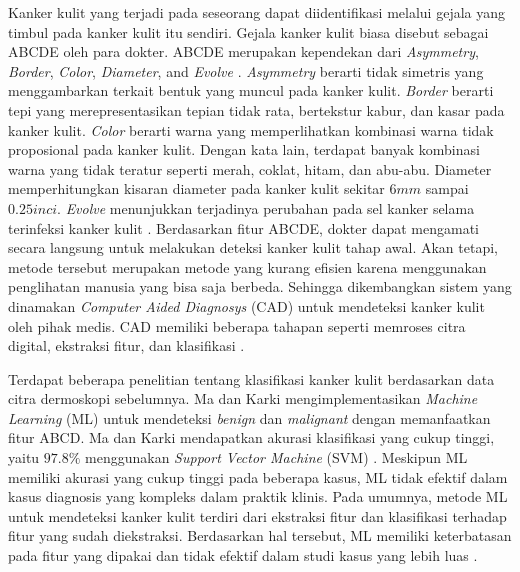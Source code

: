     Kanker kulit yang terjadi pada seseorang dapat diidentifikasi melalui gejala yang timbul pada kanker kulit itu sendiri. Gejala kanker kulit biasa disebut sebagai ABCDE oleh para dokter. ABCDE merupakan kependekan dari \textit{Asymmetry}, \textit{Border}, \textit{Color}, \textit{Diameter}, and \textit{Evolve} \citep{Gavrilov2019a}. \textit{Asymmetry} berarti tidak simetris yang menggambarkan terkait bentuk yang muncul pada kanker kulit. \textit{Border} berarti tepi yang merepresentasikan tepian tidak rata, bertekstur kabur, dan kasar pada kanker kulit. \textit{Color} berarti warna yang memperlihatkan kombinasi warna tidak proposional pada kanker kulit. Dengan kata lain, terdapat banyak kombinasi warna yang tidak teratur seperti merah, coklat, hitam, dan abu-abu. Diameter memperhitungkan kisaran diameter pada kanker kulit sekitar $6 mm$ sampai $0.25 inci$. \textit{Evolve} menunjukkan terjadinya perubahan pada sel kanker selama terinfeksi kanker kulit \citep{Saherish2020a}. Berdasarkan fitur ABCDE, dokter dapat mengamati secara langsung untuk melakukan deteksi kanker kulit tahap awal. Akan tetapi, metode tersebut merupakan metode yang kurang efisien karena menggunakan penglihatan manusia yang bisa saja berbeda. Sehingga dikembangkan sistem yang dinamakan \textit{Computer Aided Diagnosys} (CAD) untuk mendeteksi kanker kulit oleh pihak medis. CAD memiliki beberapa tahapan seperti memroses citra digital, ekstraksi fitur, dan klasifikasi \citep{Adyanti2017}.

    Terdapat beberapa penelitian tentang klasifikasi kanker kulit berdasarkan data citra dermoskopi sebelumnya. Ma dan Karki mengimplementasikan \textit{Machine Learning} (ML) untuk mendeteksi \textit{benign} dan \textit{malignant} dengan memanfaatkan fitur ABCD. Ma dan Karki mendapatkan akurasi klasifikasi yang cukup tinggi, yaitu $97.8\%$ menggunakan \textit{Support Vector Machine} (SVM) \citep{Ma2020}. Meskipun ML memiliki akurasi yang cukup tinggi pada beberapa kasus, ML tidak efektif dalam kasus diagnosis yang kompleks dalam praktik klinis. Pada umumnya, metode ML untuk mendeteksi kanker kulit terdiri dari ekstraksi fitur dan klasifikasi terhadap fitur yang sudah diekstraksi. Berdasarkan hal tersebut, ML memiliki keterbatasan pada fitur yang dipakai dan tidak efektif dalam studi kasus yang lebih luas \citep{Wu2022}.

